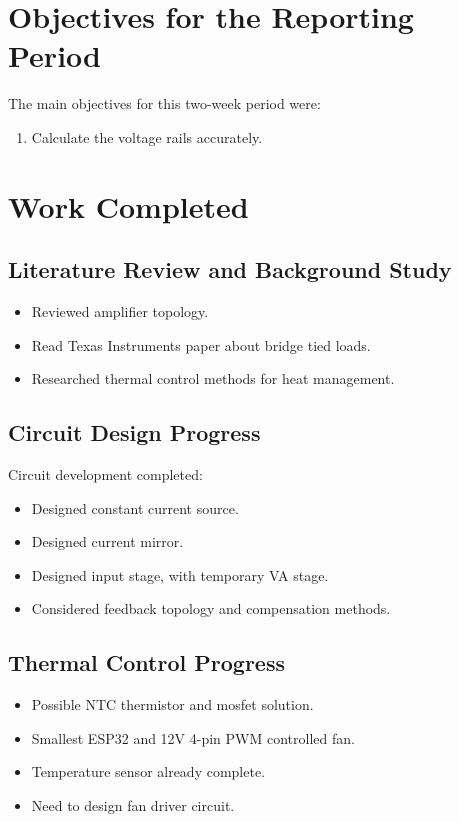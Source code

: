\documentclass[11pt,a4paper]{article}
\begin{document}
	\section{Objectives for the Reporting Period}
	
	The main objectives for this two-week period were:
	\begin{enumerate}[label=\arabic*.]
		\item Calculate the voltage rails accurately.
	\end{enumerate}
	
	\section{Work Completed}
	
	\subsection{Literature Review and Background Study}
	\begin{itemize}
		\item Reviewed amplifier topology.
		\item Read Texas Instruments paper about bridge tied loads.
		\item Researched thermal control methods for heat management.
	\end{itemize}
	
	\subsection{Circuit Design Progress}
	Circuit development completed:
	\begin{itemize}
		\item Designed constant current source.
		\item Designed current mirror.
		\item Designed input stage, with temporary VA stage.
		\item Considered feedback topology and compensation methods.
	\end{itemize}
	
	\subsection{Thermal Control Progress}
	\begin{itemize}
		\item Possible NTC thermistor and mosfet solution.
		\item Smallest ESP32 and 12V 4-pin PWM controlled fan.
		\item Temperature sensor already complete.
		\item Need to design fan driver circuit.
	\end{itemize}
	
\end{document}
